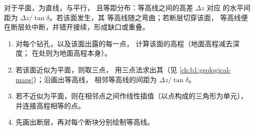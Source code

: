 对于平面，为直线，与平行，
且等距分布：等高线之间的高差 $\Delta z$ 对应
的水平间距为 $\Delta z/\tan\delta$。若该面发生，其
等高线随之弯曲；若断层切穿该面，
等高线便在断层处中断，并错开接续，形成缺口或重叠。

\begin{method}[绘制构造等高线图]\label{met:b1:cross-sections:structure-contours}
\begin{enumerate}
  \item 对每个钻孔，以及该面出露的每一点，
        计算该面的高程（地面高程减去深度；
        在处则为地面高程本身）。
  \item 若该面近似为平面，则取三点，
        用三点法求出其（见
        \cref{ch:b1:geological-maps}）；沿画出等高线，
        相邻等高线的间距为 $\Delta z/\tan\delta$。
  \item 若不近似为平面，则在相邻点之间作线性插值（以点构成的三角形为单元），
        并连接高程相等的点。
  \item 先画出断层，再对每个断块分别绘制等高线。
\end{enumerate}
\end{method}

